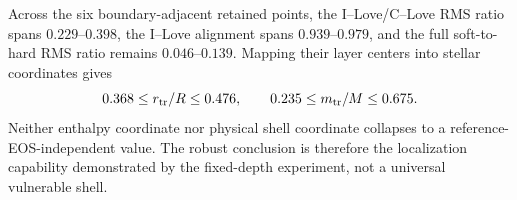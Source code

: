 Across the six boundary-adjacent retained points, the I--Love/C--Love RMS
ratio spans \(0.229\)--\(0.398\), the I--Love alignment spans
\(0.939\)--\(0.979\), and the full soft-to-hard RMS ratio remains
\(0.046\)--\(0.139\).  Mapping their layer centers into stellar
coordinates gives
\[
 0.368\le r_{\rm tr}/R\le0.476,
 \qquad
 0.235\le m_{\rm tr}/M\le0.675 .
\]
Neither enthalpy coordinate nor physical shell coordinate collapses to a
reference-EOS-independent value.  The robust conclusion is therefore the
localization capability demonstrated by the fixed-depth experiment, not a
universal vulnerable shell.



